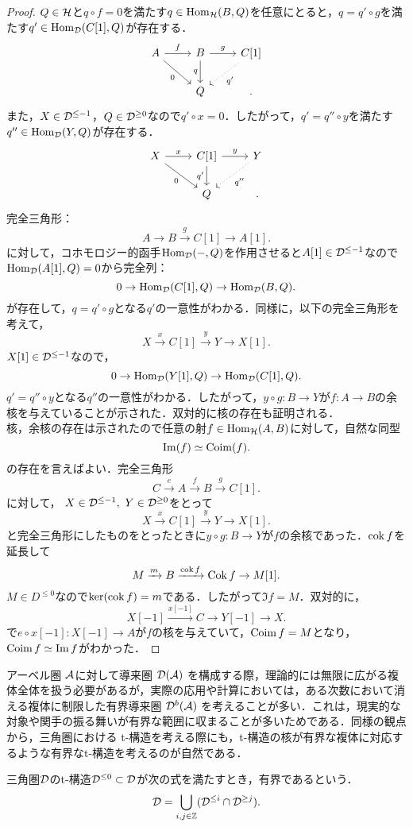 \begin{proof}
	$Q\in{\mathcal H}$と$q\circ f= 0$を満たす$q\in\operatorname{\mathrm{Hom}}_{{\mathcal H}}(B,Q)$を任意にとると，$q=q'\circ g$を満たす$q'\in\operatorname{\mathrm{Hom}}_{{\mathcal D}}(C[1],Q)$が存在する．
			\[
		\begin{tikzcd}
			A\ar[r,"f"]\ar[rd,"0",swap]&B\ar[r,"g"]\ar[d,"q",swap]& C[1]\ar[ld,"q'",dotted]\\
								 &Q &.
		\end{tikzcd}
	\]
	また，$X\in{\mathcal D}^{\le -1}$，$Q\in{\mathcal D}^{\ge 0}$なので$q'\circ x=0$．したがって，$q'=q''\circ y$を満たす$q''\in\operatorname{\mathrm{Hom}}_{{\mathcal D}}(Y,Q)$が存在する．
			\[
		\begin{tikzcd}
			X\ar[r,"x"]\ar[rd,"0",swap]& C[1]\ar[r,"y"]\ar[d,"q'",swap] & Y\ar[ld,dotted,"q''"] \\
																 &Q&.
		\end{tikzcd}
	\]
	完全三角形：
	\[A\rightarrow B\xrightarrow{g} C[1]\rightarrow A[1].\]
	に対して，コホモロジー的函手$\operatorname{\mathrm{Hom}}_{{\mathcal D}}(-,Q)$を作用させると$A[1]\in{\mathcal D}^{\le -1}$なので$\operatorname{\mathrm{Hom}}_{{\mathcal D}}(A[1],Q)=0$から完全列：
	\[0\rightarrow \operatorname{\mathrm{Hom}}_{{\mathcal D}}(C[1],Q) \rightarrow \operatorname{\mathrm{Hom}}_{{\mathcal D}}(B,Q).\]
	が存在して，$q=q'\circ g$となる$q'$の一意性がわかる．同様に，以下の完全三角形を考えて，
	\[X\xrightarrow{x} C[1]\xrightarrow{y} Y\rightarrow X[1].\]
$X[1]\in{\mathcal D}^{\le -1}$なので，
	\[0\rightarrow \operatorname{\mathrm{Hom}}_{{\mathcal D}}(Y[1],Q) \rightarrow \operatorname{\mathrm{Hom}}_{{\mathcal D}}(C[1],Q).\]
	$q'=q''\circ y$となる$q''$の一意性がわかる．したがって，$y\circ g\colon B\to Y$が$f\colon A\to B$の余核を与えていることが示された．双対的に核の存在も証明される．\\
	核，余核の存在は示されたので任意の射$f\in\operatorname{\mathrm{Hom}}_{{\mathcal H}}(A,B)$に対して，自然な同型
\[\Im(f)\simeq \operatorname{\mathrm{Coim}}(f).\]
の存在を言えばよい．完全三角形
	\[C\xrightarrow{e}A\xrightarrow{f}B\xrightarrow{g}C[1].\]
	に対して， $X\in{\mathcal D}^{\le -1},\ Y\in{\mathcal D}^{\ge 0}$をとって
	\[X\xrightarrow{x}C[1]\xrightarrow{y}Y\rightarrow X[1].\]
	と完全三角形にしたものをとったときに$y\circ g\colon B\to Y$が$f$の余核であった．$\operatorname{cok} f$を延長して
	\[M\xrightarrow{m}B\xrightarrow{\operatorname{cok} f}\operatorname{Cok} f\rightarrow M[1].\]
	$M\in D^{\le 0}$なので$\ker(\operatorname{cok} f) = m$である．したがって$\Im f= M$．双対的に，
\[X[-1]\xrightarrow{x[-1]} C \rightarrow Y[-1]\rightarrow X.\]
で$e\circ x[-1]\colon X[-1]\to A$が$f$の核を与えていて，$\operatorname{\mathrm{Coim}} f = M$となり，$\operatorname{\mathrm{Coim}} f\simeq \Im f$がわかった．
\end{proof}

アーベル圏 ${\mathcal A}$に対して導来圏 ${\mathcal D}({\mathcal A})$ を構成する際，理論的には無限に広がる複体全体を扱う必要があるが，実際の応用や計算においては，ある次数において消える複体に制限した有界導来圏 ${\mathcal D}^b({\mathcal A})$ を考えることが多い．これは，現実的な対象や関手の振る舞いが有界な範囲に収まることが多いためである．同様の観点から，三角圏における t-構造を考える際にも，t-構造の核が有界な複体に対応するような有界なt-構造を考えるのが自然である．
\begin{defn}\cite{BBD}
	三角圏${\mathcal D}$のt-構造${\mathcal D}^{\le 0}\subset {\mathcal D}$が次の式を満たすとき，有界であるという．
	\[{\mathcal D} = \bigcup_{i,j\in{\mathbb Z}}({\mathcal D}^{\le i}\cap{\mathcal D}^{\ge j}).\]
\end{defn}

